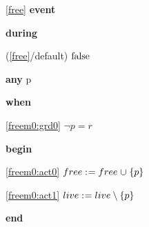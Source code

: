 \noindent \ref{free}  \textbf{event}
\begin{block}
  \item   \textbf{during}
  \begin{block}
  \item[ (\ref{free}/default) ]{$\text{false} $} %
  \end{block}
  \item   \textbf{any} p
  \item   \textbf{when}
  \begin{block}
  \item[ \eqref{freem0:grd0} ]{$\neg p = r $} %
  \end{block}
  \item   \textbf{begin}
  \begin{block}
  \item[ \eqref{freem0:act0} ]{$free \mathrel{:\mkern1mu=} free \mathbin{\mkern1mu\cup\mkern1mu} \{ p \} $} %
  \item[ \eqref{freem0:act1} ]{$live \mathrel{:\mkern1mu=} live \setminus \{ p \} $} %
  \end{block}
  \item   \textbf{end} \\
\end{block}
